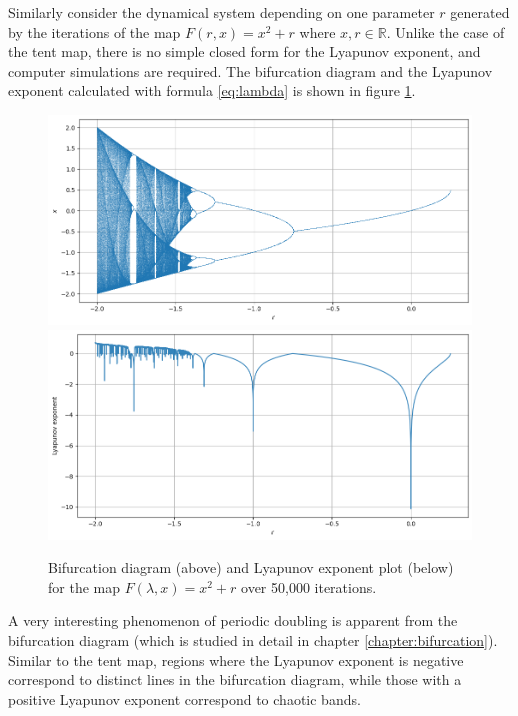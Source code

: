 \begin{exmp}
	Similarly consider the dynamical system depending on one parameter $r$ generated by the iterations of the map
    $F(r,x)=x^2+r$ where $x,r \in \mathbb{R}$.
	Unlike the case of the tent map, there is no simple closed form for the Lyapunov exponent, and computer simulations are required. 
	The bifurcation diagram and the Lyapunov exponent calculated with formula \eqref{eq:lambda} is shown in figure \ref{fig:lyapunov_x^2}.
    \begin{figure}
        \centering
        \includegraphics[width=1\linewidth]{Bifurcation Images/bifurcation_quadratic.png}
        \includegraphics[width=1\linewidth]{Bifurcation Images/lypaunov_quadratic.png}
        \caption{Bifurcation diagram (above) and Lyapunov exponent plot (below) for the map $F(\lambda,x)=x^2+r$ over 50,000 iterations.}
        \label{fig:lyapunov_x^2}
    \end{figure}
	A very interesting phenomenon of periodic doubling is apparent from the bifurcation diagram (which is studied in detail in chapter \ref{chapter:bifurcation}).
	Similar to the tent map, regions where the Lyapunov exponent is negative correspond to distinct lines in the bifurcation diagram, while those with a positive Lyapunov exponent correspond to chaotic bands.
\end{exmp}





